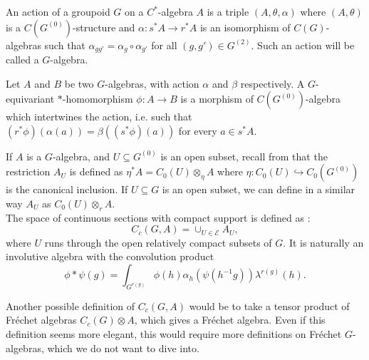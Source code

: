 \begin{definition}
An action of a groupoid $G$ on a $C^*$-algebra $A$ is a triple $(A,\theta,\alpha)$ where $(A,\theta)$ is a $C(G^{(0)})$-structure and $\alpha : s^* A \rightarrow r^* A$ is an isomorphism of $C(G)$-algebras such that $\alpha_{gg'}= \alpha_g\circ \alpha_{g'}$ for all $(g,g')\in G^{(2)}$. Such an action will be called a $G$-algebra. 
\end{definition} 

\begin{definition}
Let $A$ and $B$ be two $G$-algebras, with action $\alpha$ and $\beta$ respectively. A $G$-equivariant $*$-homomorphism $\phi :A \rightarrow B$ is a morphism of $C(G^{(0)})$-algebra which intertwines the action, i.e. such that $(r^*\phi)(\alpha(a) ) =\beta((s^*\phi)(a))$ for every $a\in s^* A$.
\end{definition} 

If $A$ is a $G$-algebra, and $U \subseteq G^{(0)}$ is an open subset, recall from \cite{LeGall} that the restriction $A_U$ is defined as $\eta^* A = C_0(U) \otimes_\eta A$ where $\eta : C_0(U) \hookrightarrow C_0(G^{(0)})$ is the canonical inclusion. If $U\subseteq G$ is an open subset, we can define in a similar way $A_U$ as $C_0(U) \otimes_r A$.\\

The space of continuous sections with compact support is defined as :
\[C_c(G,A) = \cup_{U\in \mathcal E} A_U,\]
where $U$ runs through the open relatively compact subsets of $G$. It is naturally an involutive algebra with the convolution product
\[\phi\ast \psi (g) = \int_{G^{r(g)}} \phi(h)\alpha_h(\psi(h^{-1}g))\lambda^{r(g)}(h).\] 

\begin{rk}
Another possible definition of $C_c(G,A)$ would be to take a tensor product of Fréchet algebras $C_c(G)\otimes A$, which gives a Fréchet algebra. Even if this definition seems more elegant, this would require more definitions on Fréchet $G$-algebras, which we do not want to dive into.  
\end{rk}


